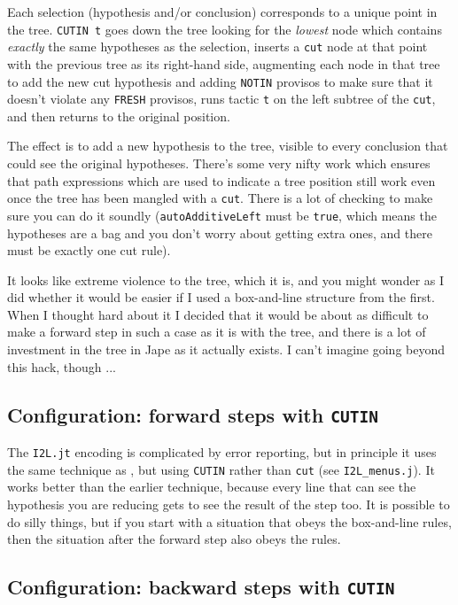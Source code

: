 \documentclass[11pt]{article}
\newcommand{\textj}[1]{{\tt\small{#1}}}
\begin{document}
Each selection (hypothesis and/or conclusion) corresponds to a unique point in the tree. \textj{CUTIN t} goes down the tree looking for the \emph{lowest} node which contains \emph{exactly} the same hypotheses as the selection, inserts a \textj{cut} node at that point with the previous tree as its right-hand side, augmenting each node in that tree to add the new cut hypothesis and adding \textj{NOTIN} provisos to make sure that it doesn't violate any \textj{FRESH} provisos, runs tactic \textj{t} on the left subtree of the \textj{cut}, and then returns to the original position. 

The effect is to add a new hypothesis to the tree, visible to every conclusion that could see the original hypotheses. There's some very nifty work which ensures that path expressions which are used to indicate a tree position still work even once the tree has been mangled with a \textj{cut}. There is a lot of checking to make sure you can do it soundly (\textj{autoAdditiveLeft} must be \textj{true}, which means the hypotheses are a bag and you don't worry about getting extra ones, and there must be exactly one cut rule).

It looks like extreme violence to the tree, which it is, and you might wonder as I did whether it would be easier if I used a box-and-line structure from the first. When I thought hard about it I decided that it would be about as difficult to make a forward step in such a case as it is with the tree, and there is a lot of investment in the tree in Jape as it actually exists. I can't imagine going beyond this hack, though ...

\subsection{Configuration: forward steps with \tt{CUTIN}}

The \textj{I2L.jt} encoding is complicated by error reporting, but in principle it uses the same technique as , but using \textj{CUTIN} rather than \textj{cut} (see \textj{I2L\_menus.j}). It works better than the earlier technique, because every line that can see the hypothesis you are reducing gets to see the result of the step too. It is possible to do silly things, but if you start with a situation that obeys the box-and-line rules, then the situation after the forward step also obeys the rules.

\subsection{Configuration: backward steps with \tt{CUTIN}}
\end{document}
